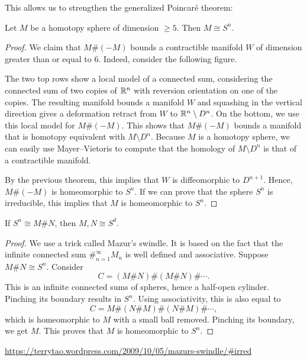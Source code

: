 This allows us to strengthen the generalized Poincaré theorem:
\begin{theorem}
    Let $M$ be a homotopy sphere of dimension  $\ge  5$. Then $M \cong S^{n}$.
\end{theorem}
\begin{proof}
    We claim that $M \# (-M)$ bounds a contractible manifold $W$ of dimension greater than or equal to $6$.
    Indeed, consider the following figure.
\begin{figure}[H]
    \centering
    \label{fig:connected-sum-homotopy-spheres}
\end{figure}
The two top rows show a local model of a connected sum, considering the connected sum of two copies of $\mathbb{R}^{n}$ with reversion orientation on one of the copies.
The resulting manifold bounds a manifold $W$ and squashing in the vertical direction gives a deformation retract from $W$ to  $ \mathbb{R}^{n} \setminus D^{n}$.
On the bottom, we use this local model for $ M \# (-M)$. This shows that $M \#(-M)$ bounds a manifold that is homotopy equivalent with  $M \setminus D^{n}$.
Because $M$ is a homotopy sphere, we can easily use Mayer--Vietoris to compute that the homology of $M \setminus D^{n}$ is that of a contractible manifold.

By the previous theorem, this implies that $W$ is diffeomorphic to $D^{n+1}$.
Hence, $M \#(-M)$ is homeomorphic to $S^{n}$.
If we can prove that the sphere $S^{n}$ is irreducible, this implies that $M$ is homeomorphic to $S^{n}$.
\end{proof}

\begin{lemma}
    If $S^{n} \cong M \# N$, then $M, N \cong S^{d}$.
\end{lemma}
\begin{proof}
    We use a trick called Mazur's swindle.
    It is based on the fact that the infinite connected sum $\#_{n=1}^{\infty} M_n$ is well defined and associative.
    Suppose $M \# N \cong S^{n}$.
    Consider
    \[
       C =  (M \# N) \# 
        (M \# N) \#  \cdots
    .\] 
    This is an infinite connected sums of spheres, hence a half-open cylinder.
    Pinching its boundary results in $S^{n}$.
    Using associativity, this is also equal to
    \[
        C= M
        \# (N \# M)
        \# (N \# M)
        \# \cdots
    ,\] 
    which is homeomorphic to $M$ with a small ball removed. Pinching its boundary, we get $M$.
    This proves that $M$ is homeomorphic to $S^{n}$.
\end{proof}
\url{https://terrytao.wordpress.com/2009/10/05/mazurs-swindle/#irred}

